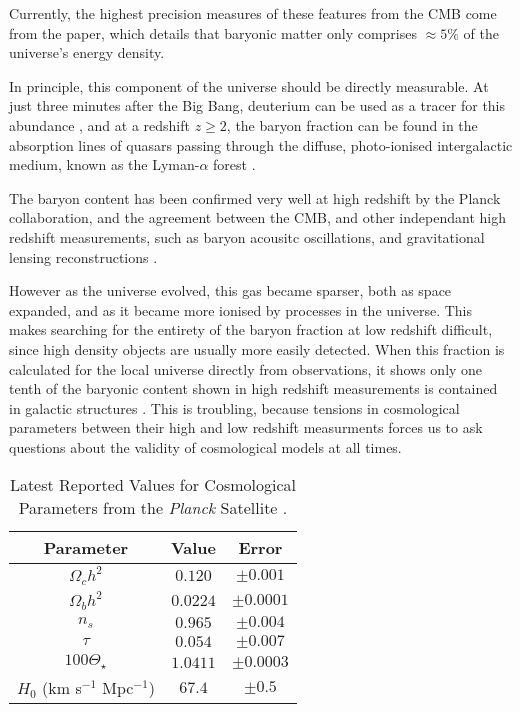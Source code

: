 Currently, the highest precision measures of these features from the CMB come from the  \cite{2018arXiv180706209P} paper, which details that baryonic matter only comprises $\approx 5 \% $ of the universe's energy density. 

\par In principle, this component of the universe should be directly measurable. At just three minutes after the Big Bang, deuterium can be used as a tracer for this abundance \citep{2007ARNPS..57..463S}, and at a redshift $z \geqslant 2$, the baryon fraction can be found in the absorption lines of quasars passing through the diffuse, photo-ionised intergalactic medium, known as the Lyman-$\alpha$ forest \citep{1997ApJ...490..564W}. 

\par The baryon content has been confirmed very well at high redshift by the Planck collaboration, and the agreement between the CMB, and other independant high redshift measurements, such as baryon acousitc oscillations, and gravitational lensing reconstructions .  

\par However as the universe evolved, this gas became sparser, both as space expanded, and as it became more ionised by processes in the universe. This makes searching for the entirety of the baryon fraction at low redshift difficult, since high density objects are usually more easily detected. When this fraction is calculated for the local universe directly from observations, it shows only one tenth of the baryonic content shown in high redshift measurements is contained in galactic structures \citep{1992MNRAS.258P..14P}. This is troubling, because tensions in cosmological parameters between their high and low redshift measurments forces us to ask questions about the validity of cosmological models at all times.

\begin{table}[h!]
\centering
\begin{tabular}{||c c c||} 
 \hline
 Parameter & Value & Error \\
 \hline\hline
 $\Omega_c h^2$ & $0.120$ & $\pm 0.001$ \\
 \hline
 $\Omega_b h^2$ & $0.0224$ & $\pm 0.0001$ \\
 \hline
  $n_s$ & $0.965$ & $\pm 0.004$ \\
 \hline
  $\tau$  & $0.054$ & $\pm 0.007$ \\
 \hline
  $100 \Theta_\star$ & $1.0411$ & $\pm 0.0003$ \\
 \hline
 $H_0$ (km s$^{-1}$ Mpc$^{-1}$) & $67.4$ & $\pm 0.5$ \\
 \hline

\end{tabular}
\caption{Latest Reported Values for Cosmological Parameters from the \emph{Planck} Satellite \citep{2018arXiv180706209P}.}
\label{table:params}
\end{table}



